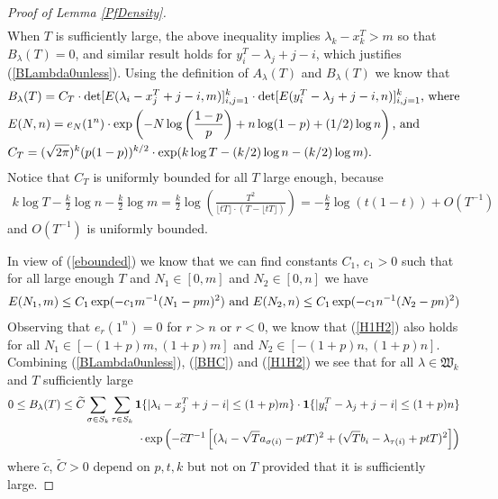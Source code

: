 \begin{proof}[Proof of Lemma \ref{PfDensity}]
\begin{equation*}
\begin{split}
	\end{split}
\end{equation*}
When $T$ is sufficiently large, the above inequality implies $\lambda_{k}-x_k^T>m$ so that $B_{\lambda}(T)=0$, and similar result holds for $y_{i}^T-\lambda_{j}+j-i$, which justifies (\ref{BLambda0unless}). Using the definition of $A_{\lambda}(T)$ and $B_{\lambda}(T)$ we know that
\begin{equation}{\label{BHC}}
	\begin{split}
		& B_{\lambda}(T)=C_{T}\cdot \det[E(\lambda_i-x_j^{T}+j-i,m)]_{i,j=1}^{k}\cdot\det[E(y_i^{T}-\lambda_j+j-i,n)]_{i,j=1}^{k}\text{, where}\\
		& E(N,n)=e_{N}(1^n)\cdot\exp\left(-N\log\left(\frac{1-p}{p}\right)+n\log(1-p)+(1/2)\log n\right)\text{, and}\\
		& C_T=(\sqrt{2\pi})^k (p(1-p))^{k/2}\cdot\exp(k\log T-(k/2)\log n-(k/2)\log m).
	\end{split}
\end{equation}
Notice that $C_{T}$ is uniformly bounded for all $T$ large enough, because
\begin{equation}
\begin{split}
	k\log T-\frac{k}{2}\log n-\frac{k}{2}\log m=\frac{k}{2}\log\left(\frac{T^2}{\lfloor tT \rfloor \cdot (T-\lfloor tT \rfloor)}\right)=-\frac{k}{2}\log(t(1-t))+O\left(T^{-1}\right)
\end{split}
\end{equation}
and $O\left(T^{-1}\right)$ is uniformly bounded.

In view of (\ref{ebounded}) we know that we can find constants $C_1$, $c_1>0$ such that for all large enough $T$ and $N_{1}\in[0,m]$ and $N_2\in[0,n]$ we have 
\begin{equation}{\label{H1H2}}
	\begin{split}
		E(N_1,m)\leq C_1\exp(-c_1 m^{-1}(N_1-pm)^2) \text{ and } E(N_2,n)\leq C_1\exp(-c_1 n^{-1}(N_2-pn)^2)
	\end{split}
\end{equation}
Observing that $e_{r}(1^{n})=0$ for $r>n$ or $r<0$, we know that (\ref{H1H2}) also holds for all $N_1\in[-(1+p)m,(1+p)m]$ and $N_2\in[-(1+p)n,(1+p)n]$. Combining (\ref{BLambda0unless}), (\ref{BHC}) and (\ref{H1H2}) we see that for all $\lambda\in\mathfrak{W}_k$ and $T$ sufficiently large
\begin{equation}{\label{BLambdaBounded}}
	\begin{split}
		0\leq B_{\lambda}(T)\leq \widetilde{C}\sum_{\sigma\in S_{k}}\sum_{\tau\in S_{k}}\mathbf{1}\{|\lambda_i-x_j^{T}+j-i|\leq(1+p)m\}\cdot\mathbf{1}\{|y_{i}^{T}-\lambda_{j}+j-i|\leq(1+p)n\}\\
		\cdot \exp\left(-\widetilde{c}T^{-1}\left[(\lambda_i-\sqrt{T}a_{\sigma(i)}-ptT)^2+(\sqrt{T}b_{i}-\lambda_{\tau(i)}+ptT)^2\right]\right)
	\end{split}
\end{equation}
where $\widetilde{c}$, $\widetilde{C}>0$ depend on $p,t,k$ but not on $T$ provided that it is sufficiently large.


\end{proof}
